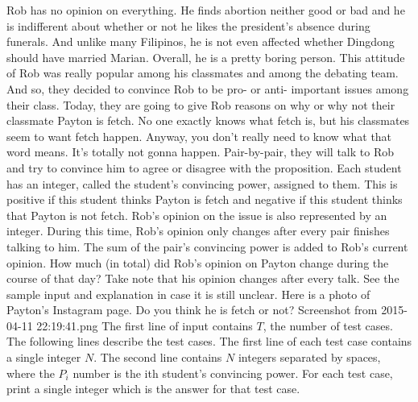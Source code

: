 Rob has no opinion on everything. He finds abortion neither good or bad and he is indifferent about whether or not he likes the president's absence during funerals. And unlike many Filipinos, he is not even affected whether Dingdong should have married Marian. Overall, he is a pretty boring person.
\n\n
This attitude of Rob was really popular among his classmates and among the debating team. And so, they decided to convince Rob to be pro- or anti- important issues among their class. Today, they are going to give Rob reasons on why or why not their classmate Payton is fetch. No one exactly knows what fetch is, but his classmates seem to want fetch happen. Anyway, you don't really need to know what that word means. It's totally not gonna happen.
\n\n
Pair-by-pair, they will talk to Rob and try to convince him to agree or disagree with the proposition. Each student has an integer, called the student's convincing power, assigned to them. This is positive if this student thinks Payton is fetch and negative if this student thinks that Payton is not fetch. Rob's opinion on the issue is also represented by an integer. During this time, Rob's opinion only changes after every pair finishes talking to him. The sum of the pair's convincing power is added to Rob's current opinion.
\n\n
How much (in total) did Rob's opinion on Payton change during the course of that day? Take note that his opinion changes after every talk. See the sample input and explanation in case it is still unclear.
\n\n
Here is a photo of Payton's Instagram page. Do you think he is fetch or not? Screenshot from 2015-04-11 22:19:41.png
\n\n
The first line of input contains $T$, the number of test cases. The following lines describe the test cases. The first line of each test case contains a single integer $N$. The second line contains $N$ integers separated by spaces, where the $P_i$ number is the ith student's convincing power.
\n\n
For each test case, print a single integer which is the answer for that test case.
